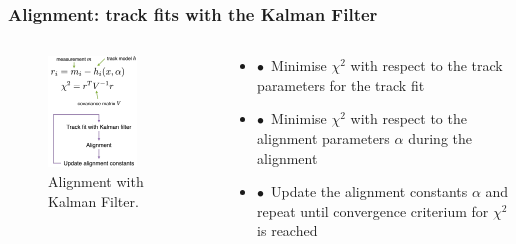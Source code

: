 \documentclass[aspectratio=1610, 12pt]{beamer}
\begin{document}
\begin{frame}\frametitle{Alignment: track fits with the Kalman Filter}
  \begin{columns}
    \begin{column}[c]{0.48\textwidth}
      \begin{figure}
        \centering
        \includegraphics[width=0.72\textwidth]{logos/kalman.png}
        \caption{Alignment with Kalman Filter.}
      \end{figure}
    \end{column}
    \begin{column}[c]{0.48\textwidth}
      \begin{itemize}
        \item $\bullet$\, Minimise $\chi^2$ with respect to the track parameters for the track fit
        \item $\bullet$\, Minimise $\chi^2$ with respect to the alignment parameters $\alpha$ during the alignment
        \item $\bullet$\, Update the alignment constants $\alpha$ and repeat until convergence criterium for $\chi^2$ is reached
      \end{itemize}
    \end{column}
  \end{columns}
\end{frame}
\end{document}
